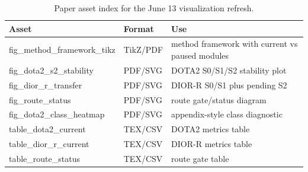\begin{table}[t]
\centering
\small
\caption{Paper asset index for the June 13 visualization refresh.}
\label{tab:visual_asset_index}
\begin{tabular}{lll}
\toprule
Asset & Format & Use \\
\midrule
fig\_method\_framework\_tikz & TikZ/PDF & method framework with current vs paused modules \\
fig\_dota2\_s2\_stability & PDF/SVG & DOTA2 S0/S1/S2 stability plot \\
fig\_dior\_r\_transfer & PDF/SVG & DIOR-R S0/S1 plus pending S2 \\
fig\_route\_status & PDF/SVG & route gate/status diagram \\
fig\_dota2\_class\_heatmap & PDF/SVG & appendix-style class diagnostic \\
table\_dota2\_current & TEX/CSV & DOTA2 metrics table \\
table\_dior\_r\_current & TEX/CSV & DIOR-R metrics table \\
table\_route\_status & TEX/CSV & route gate table \\
\bottomrule
\end{tabular}
\end{table}
